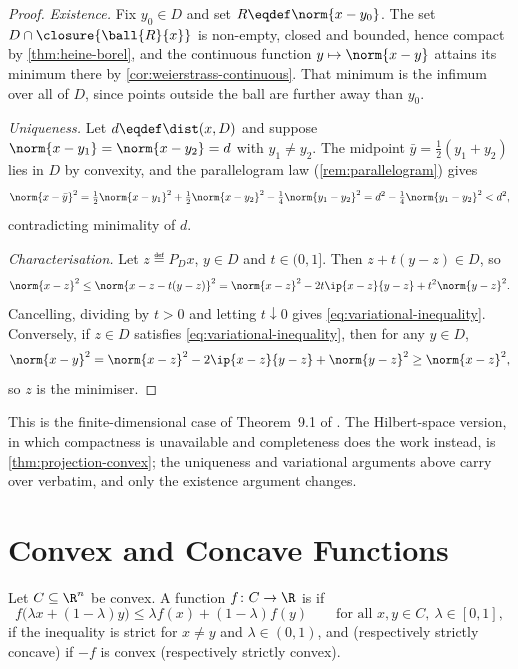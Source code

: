 \begin{proof}
	\emph{Existence.} Fix $y_0\in D$ and set $R\eqdef\norm{x-y_0}$. The set
	$D\cap\closure{\ball{R}{x}}$ is non-empty, closed and bounded, hence compact by
	\autoref{thm:heine-borel}, and the continuous function $y\mapsto\norm{x-y}$
	attains its minimum there by \autoref{cor:weierstrass-continuous}. That minimum
	is the infimum over all of $D$, since points outside the ball are further away
	than $y_0$.

	\emph{Uniqueness.} Let $d\eqdef\dist(x,D)$ and suppose
	$\norm{x-y_1}=\norm{x-y_2}=d$ with $y_1\neq y_2$. The midpoint
	$\bar y=\tfrac12(y_1+y_2)$ lies in $D$ by convexity, and the parallelogram law
	(\autoref{rem:parallelogram}) gives
	\[
		\norm{x-\bar y}^2=\tfrac12\norm{x-y_1}^2+\tfrac12\norm{x-y_2}^2
		-\tfrac14\norm{y_1-y_2}^2=d^2-\tfrac14\norm{y_1-y_2}^2<d^2,
	\]
	contradicting minimality of $d$.

	\emph{Characterisation.} Let $z\eqdef P_Dx$, $y\in D$ and $t\in(0,1]$. Then
	$z+t(y-z)\in D$, so
	\[
		\norm{x-z}^2\leq\norm{x-z-t(y-z)}^2
		=\norm{x-z}^2-2t\ip{x-z}{y-z}+t^2\norm{y-z}^2 .
	\]
	Cancelling, dividing by $t>0$ and letting $t\downarrow0$ gives
	\eqref{eq:variational-inequality}. Conversely, if $z\in D$ satisfies
	\eqref{eq:variational-inequality}, then for any $y\in D$,
	\[
		\norm{x-y}^2=\norm{x-z}^2-2\ip{x-z}{y-z}+\norm{y-z}^2\geq\norm{x-z}^2 ,
	\]
	so $z$ is the minimiser.
\end{proof}

This is the finite-dimensional case of Theorem~9.1 of
\textcite[p.~295]{fukuda2026notes}. The Hilbert-space version, in which
compactness is unavailable and completeness does the work instead, is
\autoref{thm:projection-convex}; the uniqueness and variational arguments above
carry over verbatim, and only the existence argument changes.

\section{Convex and Concave Functions}\label{sec:cvx-functions}

\begin{definition}\label{def:convex-function}
	Let $C\subseteq\R^n$ be convex. A function $f\colon C\to\R$ is
	 if
	\[
		f\bigl(\lambda x+(1-\lambda)y\bigr)\leq\lambda f(x)+(1-\lambda)f(y)
		\qquad\text{for all }x,y\in C,\ \lambda\in[0,1],
	\]
	 if the inequality is strict for $x\neq y$ and
	$\lambda\in(0,1)$, and 
	(respectively strictly concave) if $-f$ is convex (respectively strictly
	convex).
\end{definition}

